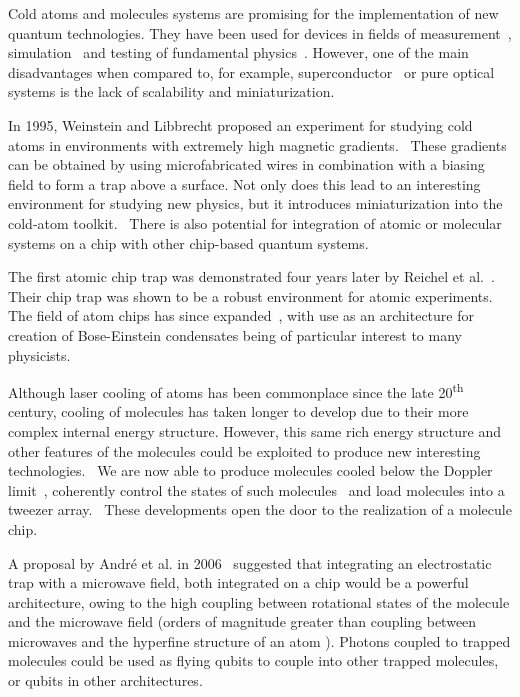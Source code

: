 Cold atoms and molecules systems are promising for the implementation of new
quantum technologies. They have been used for devices in fields of
measurement~\cite{PhysRevLett.120.103201}, simulation~\cite{Gross995} and testing of
fundamental physics~\cite{DeMille990}. However, one of the main disadvantages
when compared to, for example, superconductor~\cite{Wallraff2004} or pure
optical~\cite{Browne2017} systems is the lack of scalability and
miniaturization.~\cite{nielsenandchuang}

In 1995, Weinstein and Libbrecht proposed an experiment for
studying cold atoms in environments with extremely high magnetic
gradients.~\cite{PhysRevA.52.4004} These gradients can be obtained by using
microfabricated wires in combination with a biasing field to form a trap above
a surface. Not only does this lead to an interesting environment for studying
new physics, but it introduces miniaturization into the cold-atom
toolkit.~\cite{2011Ac} There is also potential for integration of atomic or
molecular systems on a chip with other chip-based quantum
systems.~\cite{2011Ac, Kubo2011}

The first atomic chip trap was demonstrated four years later by Reichel et
al.~\cite{Reichel1999}. Their chip trap was shown to be a robust environment for
atomic experiments. The field of atom chips has since expanded~\cite{2011Ac},
with use as an architecture for creation of Bose-Einstein condensates being of
particular interest to many physicists.~\cite{Ott2001}

Although laser cooling of atoms has been commonplace since the late
20\textsuperscript{th} century, cooling of molecules has taken longer to develop
due to their more complex internal energy structure. However, this same rich
energy structure and other features of the molecules could be exploited to
produce new interesting technologies.~\cite{Tarbutt2018} We are now able to
produce \CaF{} molecules cooled below the Doppler limit~\cite{Truppe2017},
coherently control the states of such molecules~\cite{Williams2018}
and load molecules into a tweezer array.~\cite{Anderegg2019} These developments
open the door to the realization of a molecule chip.

A proposal by Andr\'e et al. in 2006~\cite{Andre2006} suggested that integrating
an electrostatic trap with a microwave field, both integrated on a chip would be
a powerful architecture, owing to the high coupling between rotational states of
the molecule and the microwave field (orders of magnitude greater than coupling
between microwaves and the hyperfine structure of an atom ).
Photons coupled to trapped molecules could be used as flying qubits to couple
into other trapped molecules, or qubits in other
architectures.~\cite{PhysRevLett.92.063601}

